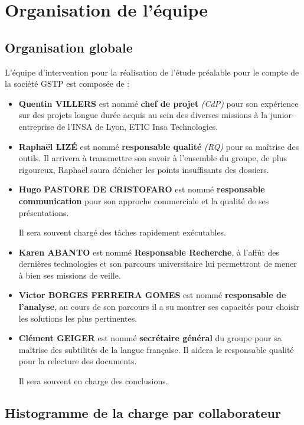 \section{Organisation de l'équipe}

\subsection{Organisation globale}

L'équipe d'intervention pour la réalisation de l'étude préalable pour le compte
de la société GSTP est composée de : 

\begin{itemize}
\item {\bf Quentin VILLERS} est nommé {\bf chef de projet} {\sl (CdP)} 
pour son expérience sur des projets longue durée acquis au sein des
diverses missions à la junior-entreprise de l'INSA de Lyon, ETIC Insa 
Technologies.
\item {\bf Raphaël LIZÉ} est nommé {\bf responsable qualité} {\sl (RQ)}
pour sa maîtrise des outils. Il arrivera à transmettre son savoir à
l'ensemble du groupe, de plus rigoureux, Raphaël saura dénicher les
points insuffisants des dossiers. 
\item {\bf Hugo PASTORE DE CRISTOFARO} est nommé {\bf responsable communication}
pour son approche commerciale et la qualité de ses présentations. 

Il sera souvent chargé des tâches rapidement exécutables.
\item {\bf Karen ABANTO} est nommé {\bf Responsable Recherche}, à l'affût
des dernières technologies et son parcours universitaire lui permettront
de mener à bien ses missions de veille.
\item {\bf Victor BORGES FERREIRA GOMES} est nommé {\bf responsable de
l'analyse}, au cours de son parcours il a su montrer ses capacités pour
choisir les solutions les plus pertinentes.
\item {\bf Clément GEIGER} est nommé {\bf secrétaire général} du groupe pour
sa maîtrise des subtilités de la langue française. Il aidera le responsable
qualité pour la relecture des documents.

Il sera souvent en charge des conclusions. 
\end{itemize}

\subsection{Histogramme de la charge par collaborateur}

